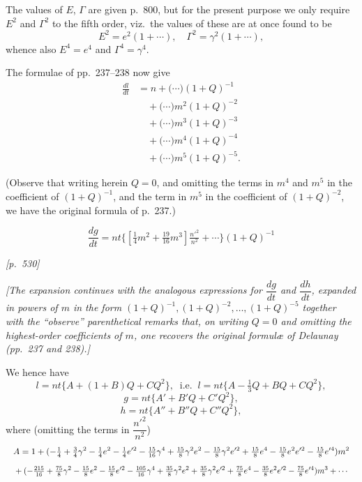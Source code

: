 \documentclass[11pt]{article}
\begin{document}
The values of $E$, $\Gamma$ are given p.~800, but for the present purpose
we only require $E^2$ and $\Gamma^2$ to the fifth order, viz.\ the values
of these are at once found to be
\[
E^2=e^2(1+\cdots),\quad \Gamma^2=\gamma^2(1+\cdots),
\]
whence also $E^4=e^4$ and $\Gamma^4=\gamma^4$.

\medskip

The formulae of pp.~237--238 now give
\[
\begin{aligned}
\frac{dl}{dt}&=n+\bigl(\cdots\bigr)(1+Q)^{-1}\\
&\quad+\bigl(\cdots\bigr)m^2(1+Q)^{-2}\\
&\quad+\bigl(\cdots\bigr)m^3(1+Q)^{-3}\\
&\quad+\bigl(\cdots\bigr)m^4(1+Q)^{-4}\\
&\quad+\bigl(\cdots\bigr)m^5(1+Q)^{-5}.
\end{aligned}
\]

(Observe that writing herein $Q=0$, and omitting the terms in $m^4$ and
$m^5$ in the coefficient of $(1+Q)^{-1}$, and the term in $m^5$ in the
coefficient of $(1+Q)^{-2}$, we have the original formula of p.~237.)

\[
\frac{dg}{dt}=nt\{[\tfrac{1}{4}m^2+\tfrac{19}{16}m^3]\tfrac{n'^2}{n^2}+\cdots\}(1+Q)^{-1}
\]


\newpage
\noindent\textit{[p.~530]}

\medskip

\textit{[The expansion continues with the analogous expressions for
$\dfrac{dg}{dt}$ and $\dfrac{dh}{dt}$, expanded in powers of $m$ in the
form $(1+Q)^{-1}, (1+Q)^{-2}, \ldots, (1+Q)^{-5}$ together with the
``observe'' parenthetical remarks that, on writing $Q=0$ and omitting
the highest-order coefficients of $m$, one recovers the original
formul\ae{} of Delaunay (pp.~237 and 238).]}

\medskip

We hence have
\[
l=nt\{A+(1+B)Q+CQ^2\},\;\;\text{i.e.}\;\;l=nt\{A-\tfrac{1}{3}Q+BQ+CQ^2\},
\]
\[
g=nt\{A'+B'Q+C'Q^2\},
\]
\[
h=nt\{A''+B''Q+C''Q^2\},
\]
where (omitting the terms in $\dfrac{n'^2}{n^2}$)
\[
\resizebox{\textwidth}{!}{$\displaystyle A=1+(-\tfrac{1}{4}+\tfrac{3}{4}\gamma^2-\tfrac{1}{4}e^2-\tfrac{1}{4}e'^2-\tfrac{15}{16}\gamma^4+\tfrac{15}{8}\gamma^2 e^2-\tfrac{15}{8}\gamma^2 e'^2+\tfrac{15}{8}e^4-\tfrac{15}{8}e^2 e'^2-\tfrac{15}{8}e'^4)m^2$}
\]
\[
\resizebox{\textwidth}{!}{$\displaystyle{}+(-\tfrac{215}{16}+\tfrac{75}{8}\gamma^2-\tfrac{15}{8}e^2-\tfrac{15}{8}e'^2-\tfrac{105}{16}\gamma^4+\tfrac{35}{8}\gamma^2 e^2+\tfrac{35}{8}\gamma^2 e'^2+\tfrac{75}{8}e^4-\tfrac{35}{8}e^2 e'^2-\tfrac{75}{8}e'^4)m^3+\cdots$}
\]
\end{document}
